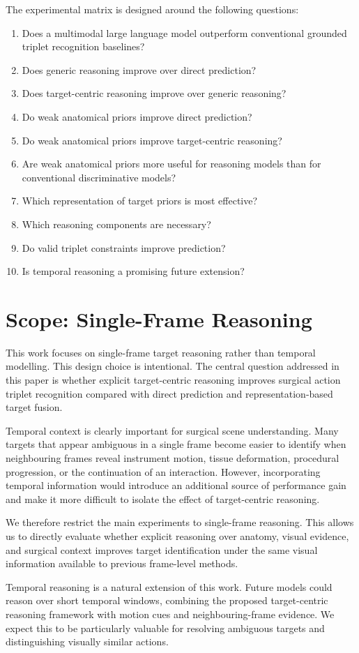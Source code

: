\documentclass[11pt]{article}
\begin{document}
The experimental matrix is designed around the following questions:

\begin{enumerate}
\item Does a multimodal large language model outperform conventional grounded triplet recognition baselines?
\item Does generic reasoning improve over direct prediction?
\item Does target-centric reasoning improve over generic reasoning?
\item Do weak anatomical priors improve direct prediction?
\item Do weak anatomical priors improve target-centric reasoning?
\item Are weak anatomical priors more useful for reasoning models than for conventional discriminative models?
\item Which representation of target priors is most effective?
\item Which reasoning components are necessary?
\item Do valid triplet constraints improve prediction?
\item Is temporal reasoning a promising future extension?
\end{enumerate}



\section{Scope: Single-Frame Reasoning}

This work focuses on single-frame target reasoning rather than temporal modelling. This design choice is intentional. The central question addressed in this paper is whether explicit target-centric reasoning improves surgical action triplet recognition compared with direct prediction and representation-based target fusion.

Temporal context is clearly important for surgical scene understanding. Many targets that appear ambiguous in a single frame become easier to identify when neighbouring frames reveal instrument motion, tissue deformation, procedural progression, or the continuation of an interaction. However, incorporating temporal information would introduce an additional source of performance gain and make it more difficult to isolate the effect of target-centric reasoning.

We therefore restrict the main experiments to single-frame reasoning. This allows us to directly evaluate whether explicit reasoning over anatomy, visual evidence, and surgical context improves target identification under the same visual information available to previous frame-level methods.

Temporal reasoning is a natural extension of this work. Future models could reason over short temporal windows, combining the proposed target-centric reasoning framework with motion cues and neighbouring-frame evidence. We expect this to be particularly valuable for resolving ambiguous targets and distinguishing visually similar actions.




\end{document}
